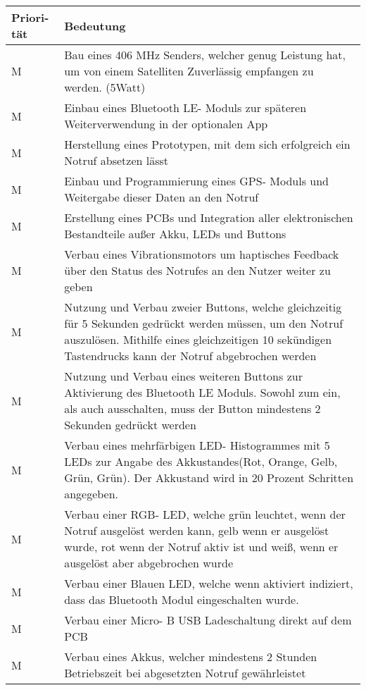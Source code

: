 \begin{tabular}{| p{1.5cm} | p{13.5cm} |}
	
	\hline
	\textbf{Priori-} \newline \textbf{tät} & 
	\textbf{Bedeutung} \\
	\hline
	
	M & 
	Bau eines 406 MHz Senders, welcher genug Leistung hat, um von einem Satelliten Zuverlässig empfangen zu werden. (5Watt) \\
	\hline
	
	M &
	Einbau eines Bluetooth LE- Moduls zur späteren Weiterverwendung in der optionalen App \\
	\hline
	
	M &
	Herstellung eines Prototypen, mit dem sich erfolgreich ein Notruf absetzen lässt  \\
	\hline
	
	M &
    Einbau und Programmierung eines GPS- Moduls und Weitergabe dieser Daten an den Notruf  \\
	\hline
	
	M &
	Erstellung eines PCBs und Integration aller elektronischen Bestandteile außer Akku, LEDs und Buttons  \\
	\hline
	
	M &
	Verbau eines Vibrationsmotors um haptisches Feedback über den Status des Notrufes an den Nutzer weiter zu geben  \\
	\hline
	
	M &
	Nutzung und Verbau zweier Buttons, welche gleichzeitig für 5 Sekunden gedrückt werden müssen, um den Notruf auszulösen. Mithilfe eines gleichzeitigen 10 sekündigen Tastendrucks kann der Notruf abgebrochen werden \\
	\hline
	
	M &
	Nutzung und Verbau eines weiteren Buttons zur Aktivierung des Bluetooth LE Moduls. Sowohl zum ein, als auch ausschalten, muss der Button mindestens 2 Sekunden gedrückt werden \\
	\hline
	
	M &
	Verbau eines mehrfärbigen LED- Histogrammes mit 5 LEDs zur Angabe des Akkustandes(Rot, Orange, Gelb, Grün, Grün). Der Akkustand wird in 20 Prozent Schritten angegeben. \\
	\hline
	
	M & 
	Verbau einer RGB- LED, welche grün leuchtet, wenn der Notruf ausgelöst werden kann, gelb wenn er ausgelöst wurde, rot wenn der Notruf aktiv ist und weiß, wenn er ausgelöst aber abgebrochen wurde \\
	\hline
	
	M & 
	Verbau einer Blauen LED, welche wenn aktiviert indiziert, dass das Bluetooth Modul eingeschalten wurde.\\
	\hline
	
	M & 
	Verbau einer Micro- B USB Ladeschaltung direkt auf dem PCB\\
	\hline
	
	M & 
	Verbau eines Akkus, welcher mindestens 2 Stunden Betriebszeit bei abgesetzten Notruf gewährleistet\\
	\hline
\end{tabular}
